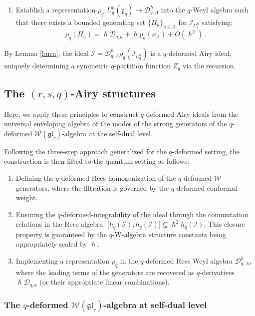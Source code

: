 \documentclass[reqno,11pt]{amsart}
\theoremstyle{plain}
\theoremstyle{definition}
\theoremstyle{remark}
\numberwithin{equation}{section}
\newcommand{\1}{\mathds{1}}
\newcommand{\2}{\frac{1}{2}}
\begin{document}
{\begin{enumerate}
					\item Establish a representation $\rho_q: U_q^\hslash(\mathfrak{g}_q) \to \mathcal{D}_{q,A}^\hslash$ into the  $q$-Weyl algebra such that there exists a bounded generating set $\{H_a\}_{a \in A}$ for $\mathcal{I}_{U_q^\hslash}$ satisfying:
					\begin{equation}
						\rho_q(H_a) = \hslash \mathcal{D}_{q,a} + \hslash p_a(x_A) + O(\hslash^2) \,.
					\end{equation}
				\end{enumerate}
				By Lemma \ref{l:uea}, the ideal $\mathcal{I} = \mathcal{D}_{q,A}^\hslash \rho_q(\mathcal{I}_{U_q^\hslash})$ is a { $q$-deformed Airy ideal}, uniquely determining a symmetric $q$-partition function $Z_q$ via the recursion.
				
				\subsection{The $(r,s,q)$-Airy structures}
				\label{s:rsairystruct}
				Here, we apply these principles to {construct }$q$-deformed Airy ideals from the universal enveloping algebra of the modes of the strong generators of the $q$-deformed $\mathcal{W}(\mathfrak{gl}_r)$-algebra at the self-dual level.
				
				Following the three-step approach generalized for the $q$-deformed setting, the construction is then lifted to the quantum  setting as follows:
				\begin{enumerate}
					\item 
					Defining the $q$-deformed-Rees homogenization of the $q$-deformed-$\mathcal{W}$ generators, where the filtration is governed by the $q$-deformed-conformal weight.
					\item 
					Ensuring the $q$-deformed-integrability of the ideal through the commutation relations in the Rees algebra: $\big[ h_q(\mathcal{I}), h_q(\mathcal{I}) \big] \subseteq \hslash^2 h_q(\mathcal{I})$. This closure property is guaranteed by the $q$-W-algebra structure constants being appropriately scaled by $\hslash$.
					\item 
					Implementing a representation $\rho_q$ in the  $q$-deformed Rees Weyl algebra $\mathcal{D}_{q,A}^\hslash$, where the leading terms of the generators are recovered as  $q$-derivatives $\hslash \mathcal{D}_{q,a}$ (or their appropriate linear combinations).\end{enumerate}
				\subsubsection{The $q$-deformed $\mathcal{W}(\mathfrak{gl}_r)$-algebra at self-dual level}
				
}
\end{document}
